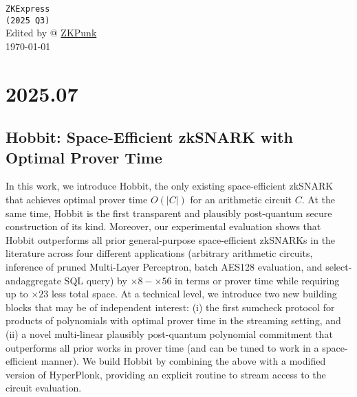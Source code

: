 \documentclass[11pt,oneside]{book}
\theoremstyle{definition}
\theoremstyle{remark}
\theoremstyle{plain}
\begin{document}
\thispagestyle{empty}
\begin{center}
\vfill
{\Huge \texttt{ZKExpress} }\\[0.8em]
{\LARGE\texttt{(2025 Q3)}}\\[2em]
{Edited by  @ \href{https://zkpunk.pro}{ZKPunk}}\\[1em]
{\large\today}
\vfill
\end{center}
\newpage

\tableofcontents
\newpage

\chapter{2025.07}
\section{\cite{cryptoeprint:2025/1214} Hobbit: Space-Efficient {zkSNARK} with Optimal Prover Time}
In this work, we introduce Hobbit, the only existing space-efficient zkSNARK that achieves optimal prover time $O(|C|)$ for an arithmetic circuit $C$. At the same time, Hobbit is the first transparent and plausibly post-quantum secure construction of its kind. Moreover, our experimental evaluation shows that Hobbit outperforms all prior general-purpose space-efficient zkSNARKs in the literature across four different applications (arbitrary arithmetic circuits, inference of pruned Multi-Layer Perceptron, batch AES128 evaluation, and select-andaggregate SQL query) by $\times 8-\times 56$ in terms or prover time while requiring up to $\times 23$ less total space.
At a technical level, we introduce two new building blocks that may be of independent interest: (i) the first sumcheck protocol for products of polynomials with optimal prover time in the streaming setting, and (ii) a novel multi-linear plausibly post-quantum polynomial commitment that outperforms all prior works in prover time (and can be tuned to work in a space-efficient manner). We build Hobbit by combining the above with a modified version of HyperPlonk, providing an explicit routine to stream access to the circuit evaluation.
\end{document}
